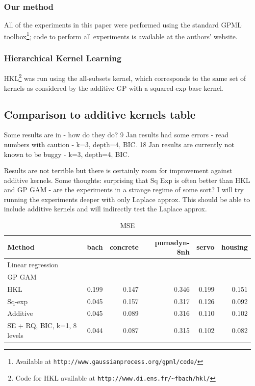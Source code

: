 \documentclass[twoside]{article}
\theoremstyle{definition}
\theoremstyle{remark}
\numberwithin{equation}{section}
\numberwithin{thm}{section}
\begin{document}
\subsubsection{Our method}
All of the experiments in this paper were performed using the standard GPML toolbox\footnote{Available at \texttt{http://www.gaussianprocess.org/gpml/code/}}; code to perform all experiments is available at the authors' website.

\subsubsection{Hierarchical Kernel Learning}	
HKL\footnote{Code for HKL available at \texttt{http://www.di.ens.fr/\textasciitilde fbach/hkl/}} was run using the all-subsets kernel, which corresponds to the same set of kernels as considered by the additive GP with a squared-exp base kernel.






\subsection{Comparison to additive kernels table}

Some results are in - how do they do?
9 Jan results had some errors - read numbers with caution - k=3, depth=4, BIC.
18 Jan results are currently not known to be buggy - k=3, depth=4, BIC.

Results are not terrible but there is certainly room for improvement against additive kernels.
Some thoughts: surprising that Sq Exp is often better than HKL and GP GAM - are the experiments in a strange regime of some sort?
I will try running the experiments deeper with only Laplace approx.
This should be able to include additive kernels and will indirectly test the Laplace approx.

\begin{table}[h!]
\begin{center}
\begin{tabular}{l | r r r r r}
Method & bach & concrete & pumadyn-8nh & servo & housing \\
\hline
Linear regression & & & & & \\
GP GAM & & & & & \\
HKL & 0.199 & 0.147 & 0.346 & 0.199 & 0.151 \\
Sq-exp & 0.045 & 0.157 & 0.317 & 0.126 & 0.092 \\
Additive & 0.045 & 0.089 & 0.316 & 0.110 & 0.102 \\
\hline
SE + RQ, BIC, k=1, 8 levels & 0.044 & 0.087 & 0.315 & 0.102 & 0.082\\
\end{tabular}
\caption{MSE}
\end{center}
\end{table}
\end{document}

